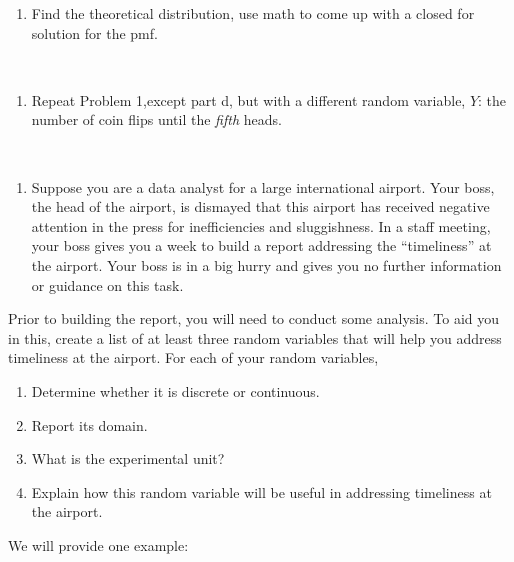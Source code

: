 \documentclass[
  letterpaper,
  DIV=11,
  numbers=noendperiod]{scrreprt}
\providecommand{\tightlist}{%
  \setlength{\itemsep}{0pt}\setlength{\parskip}{0pt}}\usepackage{longtable,booktabs,array}
\begin{document}
\begin{enumerate}
\def\labelenumi{\alph{enumi}.}
\setcounter{enumi}{3}
\tightlist
\item
  Find the theoretical distribution, use math to come up with a closed
  for solution for the pmf.
\end{enumerate}

~

\begin{enumerate}
\def\labelenumi{\arabic{enumi}.}
\setcounter{enumi}{1}
\tightlist
\item
  Repeat Problem 1,except part d, but with a different random variable,
  \(Y\): the number of coin flips until the \emph{fifth} heads.
\end{enumerate}

~

\pagebreak

\begin{enumerate}
\def\labelenumi{\arabic{enumi}.}
\setcounter{enumi}{2}
\tightlist
\item
  Suppose you are a data analyst for a large international airport. Your
  boss, the head of the airport, is dismayed that this airport has
  received negative attention in the press for inefficiencies and
  sluggishness. In a staff meeting, your boss gives you a week to build
  a report addressing the ``timeliness'' at the airport. Your boss is in
  a big hurry and gives you no further information or guidance on this
  task.
\end{enumerate}

Prior to building the report, you will need to conduct some analysis. To
aid you in this, create a list of at least three random variables that
will help you address timeliness at the airport. For each of your random
variables,

\begin{enumerate}
\def\labelenumi{\alph{enumi}.}
\tightlist
\item
  Determine whether it is discrete or continuous.\\
\item
  Report its domain.\\
\item
  What is the experimental unit?\\
\item
  Explain how this random variable will be useful in addressing
  timeliness at the airport.
\end{enumerate}

We will provide one example:
\end{document}
